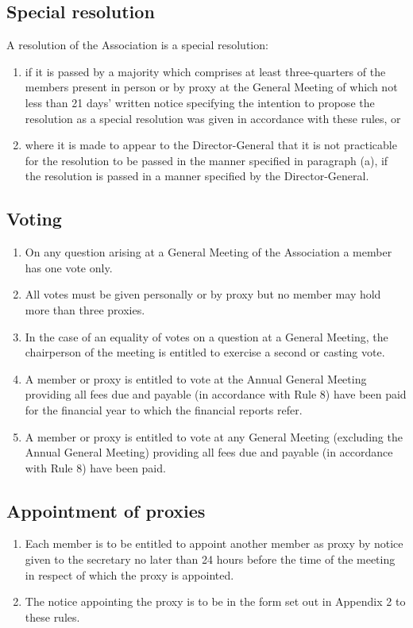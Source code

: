 \subsection{Special resolution}
A resolution of the Association is a special resolution:
\begin{enumerate}
  \item if it is passed by a majority which comprises at least three-quarters of the members present in person or by proxy at the General Meeting of which not less than 21 days’ written notice specifying the intention to propose the resolution as a special resolution was given in accordance with these rules, or
  \item where it is made to appear to the Director-General that it is not practicable for the resolution to be passed in the manner specified in paragraph (a), if the resolution is passed in a manner specified by the Director-General.
\end{enumerate}

\subsection{Voting}
\begin{enumerate}
  \item On any question arising at a General Meeting of the Association a member has one vote only.
  \item All votes must be given personally or by proxy but no member may hold more than three proxies.
  \item In the case of an equality of votes on a question at a General Meeting, the chairperson of the meeting is entitled to exercise a second or casting vote.
  \item A member or proxy is entitled to vote at the Annual General Meeting providing all fees due and payable (in accordance with Rule 8) have been paid for the financial year to which the financial reports refer.
  \item A member or proxy is entitled to vote at any General Meeting (excluding the Annual General Meeting) providing all fees due and payable (in accordance with Rule 8) have been paid.
\end{enumerate}

\subsection{Appointment of proxies}
\begin{enumerate}
  \item Each member is to be entitled to appoint another member as proxy by notice given to the secretary no later than 24 hours before the time of the meeting in respect of which the proxy is appointed.
  \item The notice appointing the proxy is to be in the form set out in Appendix 2 to these rules.
\end{enumerate}
